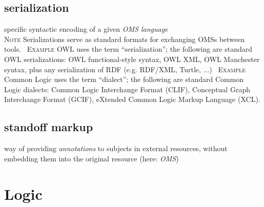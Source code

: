 \documentclass[10pt,%
\ifpretendfinal
final%
\else
draft%
\fi,
]{scrreprt}
\makeatletter
\newcommand*{\eg}{e.g.\@\xspace}
\newcommand*{\termref}[1]{\textit{#1}}
\newcommand{\sclause}[1]{\section{#1}}
\newcommand{\termdefinition}[2]{\subsection*{#1}#2}
\newenvironment{definitions}[0]{\medskip }{}
\newenvironment{note}[0]{\ \\ \textsc{Note} \quad}{}
\newenvironment{example}[0]{\ \newline \textsc{Example}\quad }{}
\makeatother
\begin{document}
\begin{definitions}
  \termdefinition{serialization}{specific syntactic encoding of a given \termref{OMS language}}
  \begin{note}
    Serializations serve as standard formats for exchanging OMSs between tools.
  \end{note}
  \begin{example}
    OWL uses the term ``serialization''; the following are standard OWL serializations: OWL functional-style syntax, OWL XML, OWL Manchester syntax, plus any serialization of RDF (\eg RDF/XML, Turtle, ...)
  \end{example}
  \begin{example}
    Common Logic uses the term ``dialect''; the following are standard Common Logic dialects: Common Logic Interchange Format (CLIF), Conceptual Graph Interchange Format (GCIF), eXtended Common Logic Markup Language (XCL).
  \end{example}

  \termdefinition{standoff markup}{way of providing \termref{annotations} to subjects in external resources, without embedding them into the original resource (here: \termref{OMS})}
\end{definitions}

\sclause{Logic}
\end{document}
